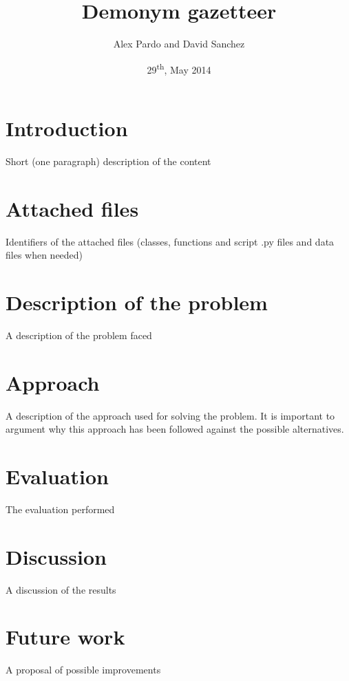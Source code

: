 \documentclass[]{report}
\title{Demonym gazetteer}
\date{29\textsuperscript{th}, May 2014}
\author{Alex Pardo and David Sanchez}
\begin{document}
\maketitle

\tableofcontents

\newpage

\section{Introduction}

Short (one paragraph) description of the content

\section{Attached files}

Identifiers of the attached files (classes, functions and script .py files and
data files when needed)

\section{Description of the problem}

A description of the problem faced

\section{Approach}

A description of the approach used for solving the problem. It is
important to argument why this approach has been followed against the
possible alternatives.

\section{Evaluation}

The evaluation performed

\section{Discussion}

A discussion of the results

\section{Future work}

A proposal of possible improvements
\end{document}
